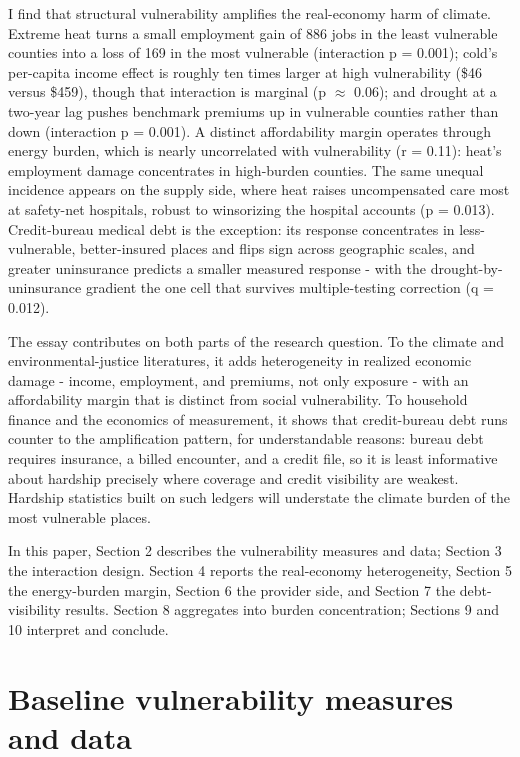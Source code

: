 \documentclass[a4paper,11pt]{article}
\begin{document}
I find that structural vulnerability amplifies the real-economy harm of climate. Extreme heat turns a small employment gain of 886 jobs in the least vulnerable counties into a loss of 169 in the most vulnerable (interaction p = 0.001); cold's per-capita income effect is roughly ten times larger at high vulnerability (\textminus{}\$46 versus \textminus{}\$459), though that interaction is marginal (p $\approx$ 0.06); and drought at a two-year lag pushes benchmark premiums up in vulnerable counties rather than down (interaction p = 0.001). A distinct affordability margin operates through energy burden, which is nearly uncorrelated with vulnerability (r = 0.11): heat's employment damage concentrates in high-burden counties. The same unequal incidence appears on the supply side, where heat raises uncompensated care most at safety-net hospitals, robust to winsorizing the hospital accounts (p = 0.013). Credit-bureau medical debt is the exception: its response concentrates in less-vulnerable, better-insured places and flips sign across geographic scales, and greater uninsurance predicts a smaller measured response - with the drought-by-uninsurance gradient the one cell that survives multiple-testing correction (q = 0.012).

The essay contributes on both parts of the research question. To the climate and environmental-justice literatures, it adds heterogeneity in realized economic damage - income, employment, and premiums, not only exposure - with an affordability margin that is distinct from social vulnerability. To household finance and the economics of measurement, it shows that credit-bureau debt runs counter to the amplification pattern, for understandable reasons: bureau debt requires insurance, a billed encounter, and a credit file, so it is least informative about hardship precisely where coverage and credit visibility are weakest. Hardship statistics built on such ledgers will understate the climate burden of the most vulnerable places.

In this paper, Section 2 describes the vulnerability measures and data; Section 3 the interaction design. Section 4 reports the real-economy heterogeneity, Section 5 the energy-burden margin, Section 6 the provider side, and Section 7 the debt-visibility results. Section 8 aggregates into burden concentration; Sections 9 and 10 interpret and conclude.

\FloatBarrier
\section{Baseline vulnerability measures and data}
\end{document}
